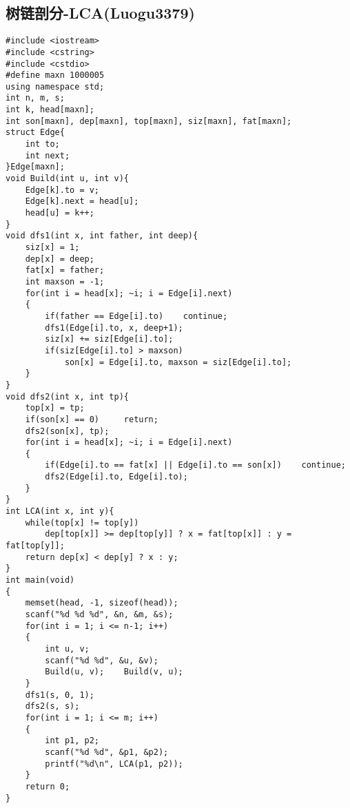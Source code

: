 \documentclass[UTF8]{ctexart}
\begin{document}
	\subsection{树链剖分-LCA(Luogu3379)}
	{\setmainfont{Consolas}
\begin{lstlisting}
#include <iostream>
#include <cstring>
#include <cstdio>
#define maxn 1000005
using namespace std;
int n, m, s;
int k, head[maxn];
int son[maxn], dep[maxn], top[maxn], siz[maxn], fat[maxn];
struct Edge{
	int to;
	int next;
}Edge[maxn];
void Build(int u, int v){
	Edge[k].to = v;
	Edge[k].next = head[u];
	head[u] = k++;
}
void dfs1(int x, int father, int deep){
	siz[x] = 1;
	dep[x] = deep;
	fat[x] = father;
	int maxson = -1;
	for(int i = head[x]; ~i; i = Edge[i].next)
	{
		if(father == Edge[i].to)	continue;
		dfs1(Edge[i].to, x, deep+1);
		siz[x] += siz[Edge[i].to];
		if(siz[Edge[i].to] > maxson)
			son[x] = Edge[i].to, maxson = siz[Edge[i].to];
	}
}
void dfs2(int x, int tp){
	top[x] = tp;
	if(son[x] == 0)		return;
	dfs2(son[x], tp);
	for(int i = head[x]; ~i; i = Edge[i].next)
	{
		if(Edge[i].to == fat[x] || Edge[i].to == son[x])	continue;
		dfs2(Edge[i].to, Edge[i].to);
	}
}
int LCA(int x, int y){
	while(top[x] != top[y])
		dep[top[x]] >= dep[top[y]] ? x = fat[top[x]] : y = fat[top[y]];
	return dep[x] < dep[y] ? x : y;
}
int main(void)
{
	memset(head, -1, sizeof(head));
	scanf("%d %d %d", &n, &m, &s);
	for(int i = 1; i <= n-1; i++)
	{
		int u, v;
		scanf("%d %d", &u, &v);
		Build(u, v);	Build(v, u);
	}
	dfs1(s, 0, 1);
	dfs2(s, s);
	for(int i = 1; i <= m; i++)
	{
		int p1, p2;
		scanf("%d %d", &p1, &p2);
		printf("%d\n", LCA(p1, p2));
	}
	return 0;
}
\end{lstlisting}}
\newpage
\end{document}
